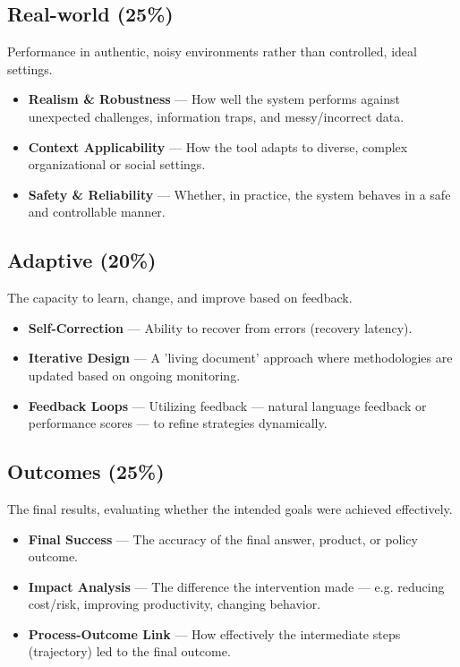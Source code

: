 \documentclass[12pt, a4paper]{article}
\begin{document}
\subsection{Real-world (25\%)}
Performance in authentic, noisy environments rather than controlled, ideal settings.
\begin{itemize}[noitemsep]
  \item \textbf{Realism \& Robustness} --- How well the system performs against unexpected challenges, information traps, and messy/incorrect data.
  \item \textbf{Context Applicability} --- How the tool adapts to diverse, complex organizational or social settings.
  \item \textbf{Safety \& Reliability} --- Whether, in practice, the system behaves in a safe and controllable manner.
\end{itemize}

\subsection{Adaptive (20\%)}
The capacity to learn, change, and improve based on feedback.
\begin{itemize}[noitemsep]
  \item \textbf{Self-Correction} --- Ability to recover from errors (recovery latency).
  \item \textbf{Iterative Design} --- A 'living document' approach where methodologies are updated based on ongoing monitoring.
  \item \textbf{Feedback Loops} --- Utilizing feedback — natural language feedback or performance scores — to refine strategies dynamically.
\end{itemize}

\subsection{Outcomes (25\%)}
The final results, evaluating whether the intended goals were achieved effectively.
\begin{itemize}[noitemsep]
  \item \textbf{Final Success} --- The accuracy of the final answer, product, or policy outcome.
  \item \textbf{Impact Analysis} --- The difference the intervention made — e.g. reducing cost/risk, improving productivity, changing behavior.
  \item \textbf{Process-Outcome Link} --- How effectively the intermediate steps (trajectory) led to the final outcome.
\end{itemize}
\end{document}

